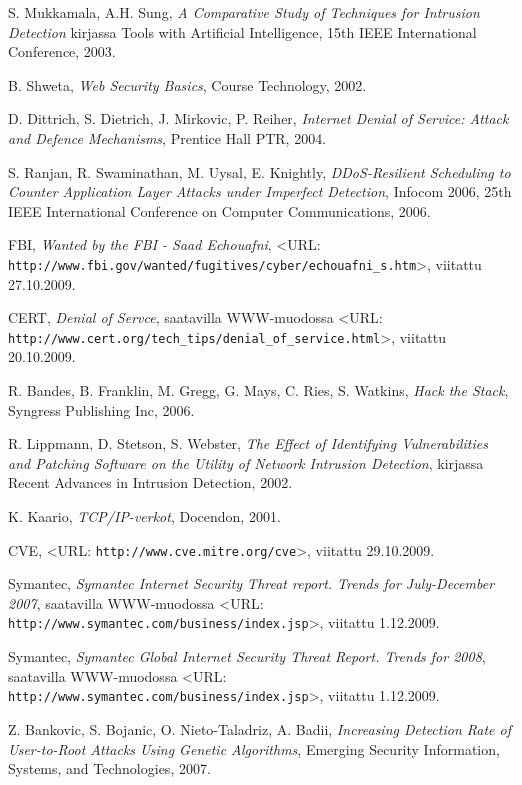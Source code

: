 \begin{thebibliography}{99}

S. Mukkamala, A.H. Sung, \textit{A Comparative Study of Techniques for Intrusion Detection} kirjassa Tools with Artificial Intelligence, 
15th IEEE International Conference, 2003.

B. Shweta, \textit{Web Security Basics}, Course Technology, 2002.

D. Dittrich, S. Dietrich, J. Mirkovic, P. Reiher, \textit{Internet Denial of Service: Attack and Defence Mechanisms}, Prentice Hall PTR, 2004.

S. Ranjan, R. Swaminathan, M. Uysal, E. Knightly, \textit{DDoS-Resilient Scheduling to Counter Application Layer Attacks under Imperfect Detection},
Infocom 2006, 25th IEEE International Conference on Computer Communications, 2006.

FBI, \textit{Wanted by the FBI - Saad Echouafni}, <URL: \texttt{http://www.fbi.gov/wanted/fugitives/cyber/echouafni\_s.htm}>, viitattu 27.10.2009.

CERT, \textit{Denial of Servce}, saatavilla WWW-muodossa <URL: \texttt{http://www.cert.org/tech\_tips/denial\_of\_service.html}>, viitattu 20.10.2009.

R. Bandes, B. Franklin, M. Gregg, G. Mays, C. Ries, S. Watkins, \textit{Hack the Stack}, Syngress Publishing Inc, 2006. 

R. Lippmann, D. Stetson, S. Webster, \textit{The Effect of Identifying Vulnerabilities and Patching Software on the Utility of Network Intrusion Detection},
kirjassa Recent Advances in Intrusion Detection, 2002.

K. Kaario, \textit{TCP/IP-verkot}, Docendon, 2001.

CVE, <URL: \texttt{http://www.cve.mitre.org/cve}>, viitattu 29.10.2009.

Symantec, \textit{Symantec Internet Security Threat report. Trends for July-December 2007}, saatavilla WWW-muodossa
<URL: \texttt{http://www.symantec.com/business/index.jsp}>, viitattu 1.12.2009.

Symantec, \textit{Symantec Global Internet Security Threat Report. Trends for 2008}, saatavilla WWW-muodossa <URL: \texttt{http://www.symantec.com/business/index.jsp}>,
viitattu 1.12.2009.


Z. Bankovic, S. Bojanic, O. Nieto-Taladriz, A. Badii, \textit{Increasing Detection Rate of User-to-Root Attacks Using Genetic Algorithms}, 
Emerging Security Information, Systems, and Technologies, 2007.


\end{thebibliography}
